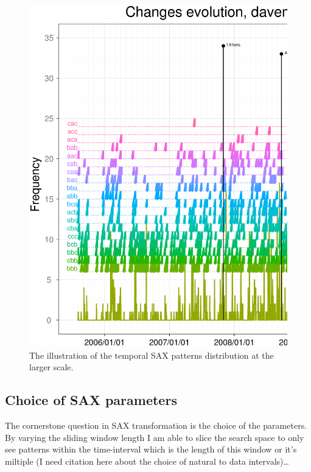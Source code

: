 \documentclass[a4paper,10pt]{article}
\numberwithin{equation}{subsection}
\begin{document}
\begin{figure}[h]
\noindent\begin{minipage}{\textwidth}
  \centering
  \includegraphics[width=\textwidth]{figures/long_patterns.ps}
  \caption{The illustration of the temporal SAX patterns distribution at the larger scale.}
  \label{fig:march_patterns2}
\end{minipage}
\end{figure}

\subsection{Choice of SAX parameters}
The cornerstone question in SAX transformation is the choice of the parameters. By varying the sliding window 
length I am able to slice the search space to only see patterns within the time-interval which is the length
of this window or it's miltiple (I need citation here about the choice of natural to data intervals)\ldots
\end{document}
